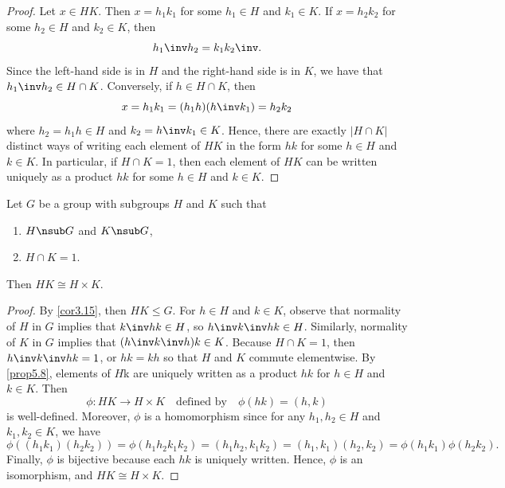 \begin{proof}
    Let $x \in HK$. Then $x = h_1k_1$ for some $h_1 \in H$ and $k_1 \in K$. If $x = h_2k_2$ for some $h_2 \in H$ and $k_2 \in K$, then
    \[h_1\inv h_2 = k_1 k_2\inv.\]
    Since the left-hand side is in $H$ and the right-hand side is in $K$, we have that $h_1\inv h_2 \in H \cap K$. Conversely, if $h \in H \cap K$, then
    \[x = h_1 k_1 = (h_1 h) (h\inv k_1) = h_2 k_2\]
    where $h_2 = h_1 h \in H$ and $k_2 = h\inv k_1 \in K$. Hence, there are exactly $|H \cap K|$ distinct ways of writing each element of $HK$ in the form $hk$ for some $h \in H$ and $k \in K$. In particular, if $H \cap K = 1$, then each element of $HK$ can be written uniquely as a product $hk$ for some $h \in H$ and $k \in K$.
\end{proof}

\begin{theo}
    \label{theo5.9}
    Let $G$ be a group with subgroups $H$ and $K$ such that
    \begin{enumerate}
        \item $H \nsub G$ and $K \nsub G$,
        \item $H \cap K = 1$.
    \end{enumerate}
    Then $HK \cong H \times K$.
\end{theo}

\begin{proof}
    By \autoref{cor3.15}, then $HK \leq G$. For $h \in H$ and $k \in K$, observe that normality of $H$ in $G$ implies that $k\inv hk \in H$, so $h\inv k\inv hk \in H$. Similarly, normality of $K$ in $G$ implies that $(h\inv k\inv h)k \in K$. Because $H \cap K = 1$, then $h\inv k\inv hk = 1$, or $hk = kh$ so that $H$ and $K$ commute elementwise. By \autoref{prop5.8}, elements of $H$k are uniquely written as a product $hk$ for $h \in H$ and $k \in K$. Then
    \[\phi : HK \to H \times K \quad \text{defined by} \quad \phi(hk) = (h, k)\]
    is well-defined. Moreover, $\phi$ is a homomorphism since for any $h_1, h_2 \in H$ and $k_1, k_2 \in K$, we have
    \[\phi((h_1k_1)(h_2k_2)) = \phi(h_1 h_2 k_1 k_2) = (h_1 h_2, k_1 k_2) = (h_1, k_1)(h_2, k_2) = \phi(h_1k_1)\phi(h_2k_2).\]
    Finally, $\phi$ is bijective because each $hk$ is uniquely written. Hence, $\phi$ is an isomorphism, and $HK \cong H \times K$.
\end{proof}

